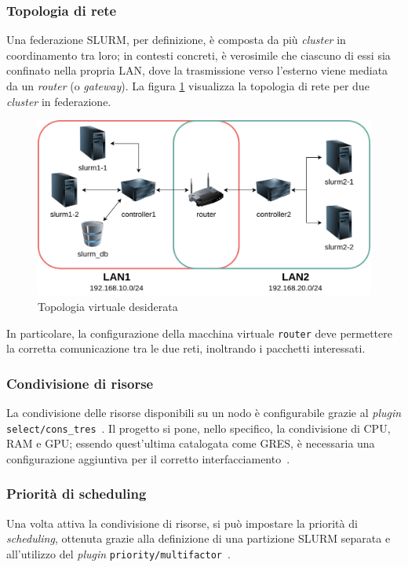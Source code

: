 \documentclass[12pt,a4paper,twoside,openright]{book}
\begin{document}
\subsubsection{Topologia di rete}
Una federazione \ac{SLURM}, per definizione, è composta da più \textit{cluster} in coordinamento tra loro; in contesti concreti, è verosimile che ciascuno di essi sia confinato nella propria \ac{LAN}, dove la trasmissione verso l'esterno viene mediata da un \textit{router} (o \textit{gateway}). La figura \ref{fig:topology} visualizza la topologia di rete per due \textit{cluster} in federazione.
\begin{figure}[ht]
    \centering
    \includegraphics[width=0.9\linewidth]{images/topology.png}
    \caption{Topologia virtuale desiderata}
    \label{fig:topology}
\end{figure}

In particolare, la configurazione della macchina virtuale \texttt{router} deve permettere la corretta comunicazione tra le due reti, inoltrando i pacchetti interessati.

\subsubsection{Condivisione di risorse}
La condivisione delle risorse disponibili su un nodo è configurabile grazie al \textit{plugin} \texttt{select/cons\_tres}~\cite{slurmconstres}. Il progetto si pone, nello specifico, la condivisione di \ac{CPU}, \ac{RAM} e \ac{GPU}; essendo quest'ultima catalogata come \acf{GRES}, è necessaria una configurazione aggiuntiva per il corretto interfacciamento~\cite{slurmgres}.

\subsubsection{Priorità di scheduling}
Una volta attiva la condivisione di risorse, si può impostare la priorità di \textit{scheduling}, ottenuta grazie alla definizione di una partizione \ac{SLURM} separata e all'utilizzo del \textit{plugin} \texttt{priority/multifactor}~\cite{slurmmultifactor}.
\end{document}
